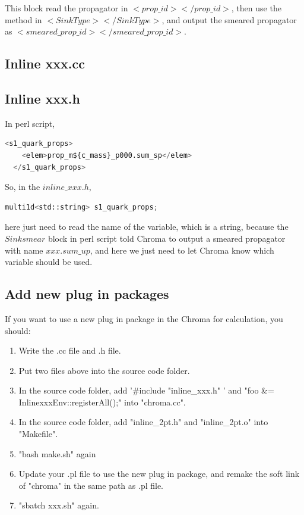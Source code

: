 \documentclass{article}
\begin{document}
This block read the propagator in $<prop\_id> </prop\_id>$, then use the method in $<SinkType> </SinkType>$, and output the smeared propagator as $<smeared\_prop\_id> </smeared\_prop\_id>$.


\subsection{Inline xxx.cc}



\subsection{Inline xxx.h}
In perl script,

\begin{lstlisting}[language=Python]
    <s1_quark_props>
    <elem>prop_m${c_mass}_p000.sum_sp</elem>
  </s1_quark_props>
\end{lstlisting}

So, in the $inline\_xxx.h$,

\begin{lstlisting}[language=Python]
    multi1d<std::string> s1_quark_props; 
\end{lstlisting}

here just need to read the name of the variable, which is a string, because the $Sink smear$ block in perl script told Chroma to output a smeared propagator with name $xxx.sum\_up$, and here we just need to let Chroma know which variable should be used.

\subsection{Add new plug in packages}

If you want to use a new plug in package in the Chroma for calculation, you should:

\begin{enumerate}
    \item Write the .cc file and .h file.
    \item Put two files above into the source code folder.
    \item In the source code folder, add '\#include "inline\_xxx.h" ' and "foo \&= InlinexxxEnv::registerAll();" into "chroma.cc".
    \item In the source code folder, add "inline\_2pt.h" and "inline\_2pt.o" into "Makefile".
    \item "bash make.sh" again
    \item Update your .pl file to use the new plug in package, and remake the soft link of "chroma" in the same path as .pl file.
    \item "sbatch xxx.sh" again.
\end{enumerate}
\end{document}
